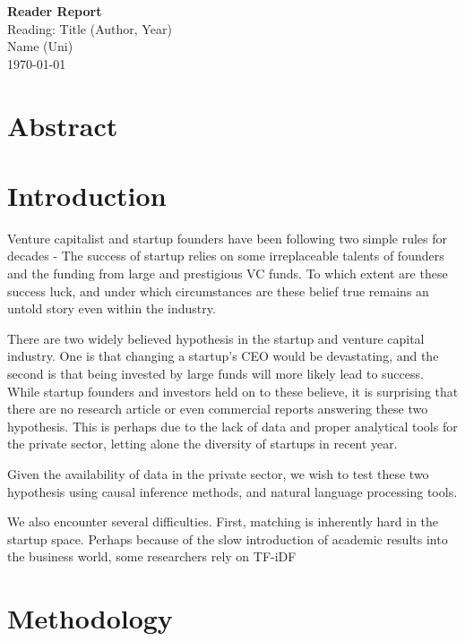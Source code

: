 \documentclass[12pt]{article}
\begin{document}
\large \textbf{Reader Report} \\
Reading: Title (Author, Year) \\
Name (Uni) \\
\today

\vspace{0.1in}

\normalsize

\section{Abstract}


\section{Introduction}
Venture capitalist and startup founders have been following two simple rules for decades - The success of startup relies on some irreplaceable talents of founders and the funding from large and prestigious VC funds.
To which extent are these success luck, and under which circumstances are these belief true remains an untold story even within the industry.

There are two widely believed hypothesis in the startup and venture capital industry. One is that changing a startup's CEO would be devastating, and the second is that being invested by large funds will more likely lead to success. While startup founders and investors held on to these believe, it is surprising that there are no research article or even commercial reports answering these two hypothesis. This is perhaps due to the lack of data and proper analytical tools for the private sector, letting alone the diversity of startups in recent year.

Given the availability of data in the private sector, we wish to test these two hypothesis using causal inference methods, and natural language processing tools.

We also encounter several difficulties. First, matching is inherently hard in the startup space. Perhaps because of the slow introduction of academic results into the business world, some researchers rely on TF-iDF

\section{Methodology}
\end{document}
